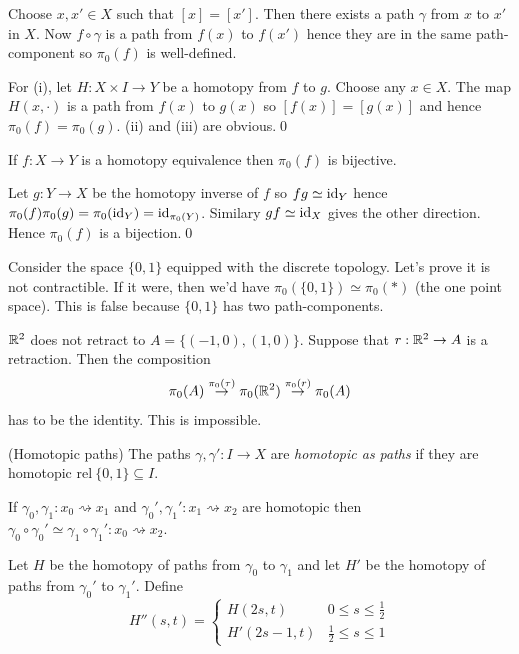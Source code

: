\documentclass{article}
\newcommand{\rel}{\mathrm{rel}\:}
\begin{document}
\pf Choose $ x,x'\in X $ such that $ [x]=[x'] $. Then there exists a path $ \gamma $ from $ x $ to $ x' $ in $ X $. Now $ f\circ \gamma $ is a path from $ f(x) $ to $ f(x') $ hence they are in the same path-component so $ \pi_0(f) $ is well-defined.\par
For (i), let $ H:X\times I \to Y $ be a homotopy from $ f $ to $ g $. Choose any $ x\in X $. The map $ H(x,\cdot) $ is a path from $ f(x) $ to $ g(x) $ so $ [f(x)] = [g(x)] $ and hence $ \pi_0(f) = \pi_0(g) $. (ii) and (iii) are obvious.\qed
\begin{corollary}
  If $ f:X\to Y $ is a homotopy equivalence then $ \pi_0(f) $ is bijective.
\end{corollary}
\pf Let $ g: Y \to X $ be the homotopy inverse of $ f $ so $ fg\simeq \mathrm{id}_Y $ hence $ \pi_0(f) \pi_0(g) = \pi_0(\mathrm{id}_Y) = \mathrm{id}_{\pi_0(Y)} $. Similary $ gf\simeq \mathrm{id}_X $ gives the other direction. Hence $ \pi_0(f) $ is a bijection.\qed
\begin{example}
	Consider the space $ \{0,1\} $ equipped with the discrete topology. Let's prove it is not contractible. If it were, then we'd have $ \pi_0(\{0,1\}) \simeq \pi_0(*) $ (the one point space). This is false because $ \{0,1\} $ has two path-components.
\end{example}
\begin{example}
	$ \mathbb{R}^2 $ does not retract to $ A = \{(-1,0), (1,0)\} $. Suppose that $ r: \mathbb{R}^2 \to A $ is a retraction. Then the composition
	\[
		\pi_0(A) \overset{\pi_0(\tau)}\rightarrow \pi_0(\mathbb{R}^2) \overset{\pi_0(r)}\rightarrow \pi_0(A)
	\]
	has to be the identity. This is impossible.
\end{example}
\begin{definition}
	(Homotopic paths) The paths $ \gamma,\gamma':I \to X $ are \textit{homotopic as paths} if they are homotopic $ \rel \{0,1\} \subseteq I$.
\end{definition}
\begin{lemma}
  If $ \gamma_0,\gamma_1:  x_0\rightsquigarrow x_1 $ and $ \gamma_0', \gamma_1':x_1 \rightsquigarrow x_2 $ are homotopic then $ \gamma_0\circ\gamma_0' \simeq \gamma_1 \circ \gamma_1':x_0\rightsquigarrow x_2 $.
\end{lemma}
\pf Let $ H $ be the homotopy of paths from $ \gamma_0 $ to $ \gamma_1 $ and let $ H' $  be the homotopy of paths from $ \gamma_0' $ to $ \gamma_1' $. Define 
\[
  H''(s,t) = \begin{cases}
	  H(2s,t) & 0\le s \le \frac 12 \\
	  H'(2s-1,t) & \frac 12 \le s \le 1
  \end{cases}
\]
\end{document}
